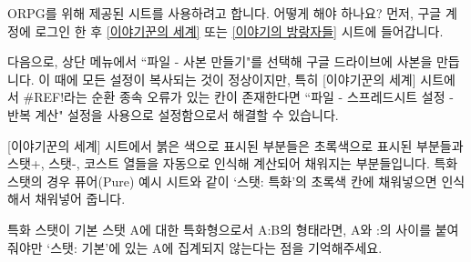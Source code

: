 \documentclass{report}
\begin{document}
	\begin{faq}{ORPG를 위해 제공된 시트를 사용하려고 합니다. 어떻게 해야 하나요?}
		먼저, 구글 계정에 로그인 한 후 \href{https://docs.google.com/spreadsheets/d/1g3ZO-oALMVbytbE2tvSBdT6czxB32XHZ1crWIGavEhQ/edit?usp=sharing}{[이야기꾼의 세계]} 또는 \href{https://docs.google.com/spreadsheets/d/14xSfMVRGJlXmEfHmg3_xD5Mbd9HLniCgCktDBgF5O44/edit?usp=sharing}{[이야기의 방랑자들]} 시트에 들어갑니다.
		
		다음으로, 상단 메뉴에서 ``파일 - 사본 만들기"를 선택해 구글 드라이브에 사본을 만듭니다. 이 때에 모든 설정이 복사되는 것이 정상이지만, 특히 [이야기꾼의 세계] 시트에서 \#REF!라는 순환 종속 오류가 있는 칸이 존재한다면 ``파일 - 스프레드시트 설정 - 반복 계산" 설정을 사용으로 설정함으로서 해결할 수 있습니다.
		
		[이야기꾼의 세계] 시트에서 붉은 색으로 표시된 부분들은 초록색으로 표시된 부분들과 스탯+, 스탯-, 코스트 열들을 자동으로 인식해 계산되어 채워지는 부분들입니다. 특화 스탯의 경우 퓨어(Pure) 예시 시트와 같이 `스탯: 특화'의 초록색 칸에 채워넣으면 인식해서 채워넣어 줍니다.
		
		특화 스탯이 기본 스탯 A에 대한 특화형으로서 A:B의 형태라면, A와 :의 사이를 붙여줘야만 `스탯: 기본'에 있는 A에 집계되지 않는다는 점을 기억해주세요.
	\end{faq}
\end{document}
